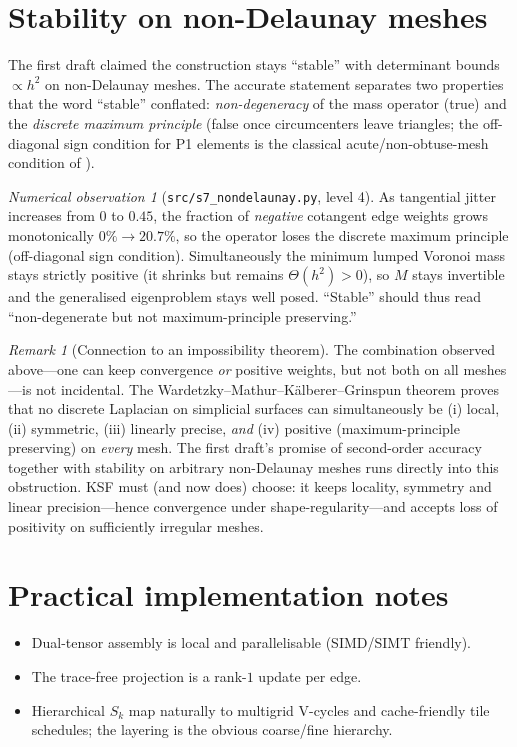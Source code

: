 \documentclass[11pt]{article}
\theoremstyle{plain}
\theoremstyle{definition}
\theoremstyle{remark}
\newtheorem{remark}[theorem]{Remark}
\newtheorem{observation}[theorem]{Numerical observation}
\begin{document}
\section{Stability on non-Delaunay meshes}
\label{sec:nondelaunay}
The first draft claimed the construction stays ``stable'' with determinant bounds
$\propto h^2$ on non-Delaunay meshes. The accurate statement separates two
properties that the word ``stable'' conflated: \emph{non-degeneracy} of the mass
operator (true) and the \emph{discrete maximum principle} (false once
circumcenters leave triangles; the off-diagonal sign condition for P1 elements is
the classical acute/non-obtuse-mesh condition of \citet{ciarlet1973maximum}).

\begin{observation}[\texttt{src/s7\_nondelaunay.py}, level 4]
\label{obs:s7}
As tangential jitter increases from $0$ to $0.45$, the fraction of \emph{negative}
cotangent edge weights grows monotonically $0\%\to 20.7\%$, so the operator loses
the discrete maximum principle (off-diagonal sign condition). Simultaneously the
minimum lumped Voronoi mass stays strictly positive (it shrinks but remains
$\Theta(h^2)>0$), so $M$ stays invertible and the generalised eigenproblem stays
well posed. ``Stable'' should thus read ``non-degenerate but not
maximum-principle preserving.''
\end{observation}

\begin{remark}[Connection to an impossibility theorem]
\label{rem:nofreelunch}
The combination observed above---one can keep convergence \emph{or} positive
weights, but not both on all meshes---is not incidental. The
Wardetzky--Mathur--Kälberer--Grinspun theorem
\citep{wardetzky2007discrete} proves that no discrete Laplacian on simplicial
surfaces can simultaneously be (i) local, (ii) symmetric, (iii) linearly
precise, \emph{and} (iv) positive (maximum-principle preserving) on \emph{every}
mesh. The first draft's promise of second-order accuracy together with stability
on arbitrary non-Delaunay meshes runs directly into this obstruction. KSF must
(and now does) choose: it keeps locality, symmetry and linear precision---hence
convergence under shape-regularity---and accepts loss of positivity on
sufficiently irregular meshes.
\end{remark}

\section{Practical implementation notes}
\begin{itemize}
  \item Dual-tensor assembly is local and parallelisable (SIMD/SIMT friendly).
  \item The trace-free projection is a rank-$1$ update per edge.
  \item Hierarchical $S_k$ map naturally to multigrid V-cycles and cache-friendly
    tile schedules; the layering is the obvious coarse/fine hierarchy.
\end{itemize}
\end{document}
